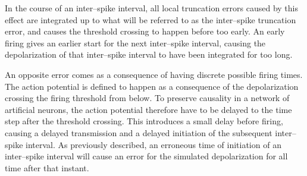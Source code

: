 	In the course of an inter--spike interval, all local truncation errors caused by this effect are integrated up to what will be referred to as the inter--spike truncation error,
		and causes the threshold crossing to happen before too early.
	An early firing gives an earlier start for the next inter--spike interval, causing the depolarization of that inter--spike interval to have been integrated for too long. %


	
	An opposite error comes as a consequence of having discrete possible firing times.
	The action potential is defined to happen as a consequence of the depolarization crossing the firing threshold from below.
	To preserve causality in a network of artificial neurons, the action potential therefore have to be delayed to the time step after the threshold crossing.
	This introduces a small delay before firing, causing a delayed transmission and a delayed initiation of the subsequent inter--spike interval.
	As previously described, an erroneous time of initiation of an inter--spike interval will cause an error for the simulated depolarization for all time after that instant. 



